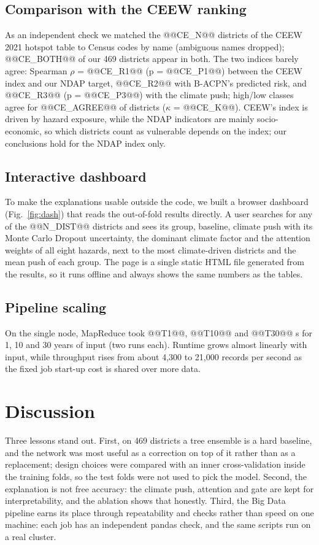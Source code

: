 \documentclass[conference]{IEEEtran}
\begin{document}
\subsection{Comparison with the CEEW ranking}
As an independent check we matched the @@CE_N@@ districts of the CEEW 2021 hotspot table \cite{ceew2021} to Census codes by name (ambiguous names dropped); @@CE_BOTH@@ of our 469 districts appear in both. The two indices barely agree: Spearman $\rho$ = @@CE_R1@@ (p = @@CE_P1@@) between the CEEW index and our NDAP target, @@CE_R2@@ with B-ACPN's predicted risk, and @@CE_R3@@ (p = @@CE_P3@@) with the climate push; high/low classes agree for @@CE_AGREE@@ of districts ($\kappa$ = @@CE_K@@). CEEW's index is driven by hazard exposure, while the NDAP indicators are mainly socio-economic, so which districts count as vulnerable depends on the index; our conclusions hold for the NDAP index only.

\subsection{Interactive dashboard}
To make the explanations usable outside the code, we built a browser dashboard (Fig.~\ref{fig:dash}) that reads the out-of-fold results directly. A user searches for any of the @@N_DIST@@ districts and sees its group, baseline, climate push with its Monte Carlo Dropout uncertainty, the dominant climate factor and the attention weights of all eight hazards, next to the most climate-driven districts and the mean push of each group. The page is a single static HTML file generated from the results, so it runs offline and always shows the same numbers as the tables.



\subsection{Pipeline scaling}
On the single node, MapReduce took @@T1@@, @@T10@@ and @@T30@@ s for 1, 10 and 30 years of input (two runs each). Runtime grows almost linearly with input, while throughput rises from about 4,300 to 21,000 records per second as the fixed job start-up cost is shared over more data.

\FloatBarrier
\section{Discussion}
Three lessons stand out. First, on 469 districts a tree ensemble is a hard baseline, and the network was most useful as a correction on top of it rather than as a replacement; design choices were compared with an inner cross-validation inside the training folds, so the test folds were not used to pick the model. Second, the explanation is not free accuracy: the climate push, attention and gate are kept for interpretability, and the ablation shows that honestly. Third, the Big Data pipeline earns its place through repeatability and checks rather than speed on one machine: each job has an independent pandas check, and the same scripts run on a real cluster.
\end{document}
